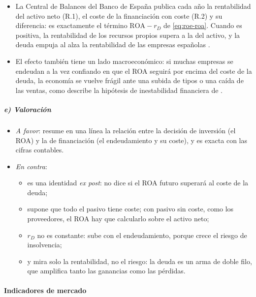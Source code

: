 \documentclass[11pt]{article}
\begin{document}
\begin{itemize}
\item La Central de Balances del Banco de España publica cada año la rentabilidad del activo neto (R.1), el coste de la financiación con coste (R.2) y su diferencia: es exactamente el término $\mathrm{ROA}-r_D$ de \eqref{eq:roe-roa}. Cuando es positiva, la rentabilidad de los recursos propios supera a la del activo, y la deuda empuja al alza la rentabilidad de las empresas españolas \nocite{BdE2025CBA2024}.
\item El efecto también tiene un lado macroeconómico: si muchas empresas se endeudan a la vez confiando en que el ROA seguirá por encima del coste de la deuda, la economía se vuelve frágil ante una subida de tipos o una caída de las ventas, como describe la hipótesis de inestabilidad financiera de  \nocite{Minsky1992Financial}.
\end{itemize}

\subparagraph{e) Valoración}

\begin{itemize}
\item \emph{A favor}: resume en una línea la relación entre la decisión de inversión (el ROA) y la de financiación (el endeudamiento y su coste), y es exacta con las cifras contables.
\item \emph{En contra}:
  \begin{itemize}
  \item es una identidad \emph{ex post}: no dice si el ROA futuro superará al coste de la deuda;
  \item supone que todo el pasivo tiene coste; con pasivo sin coste, como los proveedores, el ROA hay que calcularlo sobre el activo neto;
  \item $r_D$ no es constante: sube con el endeudamiento, porque crece el riesgo de insolvencia;
  \item y mira solo la rentabilidad, no el riesgo: la deuda es un arma de doble filo, que amplifica tanto las ganancias como las pérdidas.
  \end{itemize}
\end{itemize}

\paragraph{Indicadores de mercado}
\end{document}
